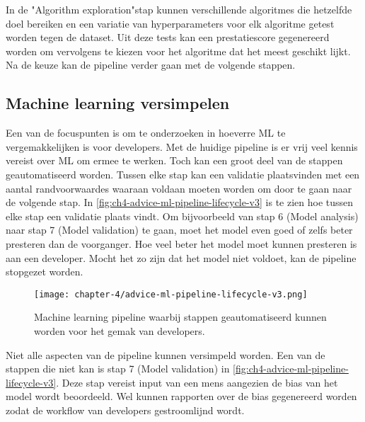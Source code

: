 In de "Algorithm exploration"\space stap kunnen verschillende algoritmes die hetzelfde doel bereiken en een variatie van hyperparameters voor elk algoritme getest worden tegen de dataset. Uit deze tests kan een prestatiescore gegenereerd worden om vervolgens te kiezen voor het algoritme dat het meest geschikt lijkt. Na de keuze kan de pipeline verder gaan met de volgende stappen.

\subsection{Machine learning versimpelen}\label{subsec:ch4-machine-learning-versimpelen}
Een van de focuspunten is om te onderzoeken in hoeverre ML te vergemakkelijken is voor developers. Met de huidige pipeline is er vrij veel kennis vereist over ML om ermee te werken. Toch kan een groot deel van de stappen geautomatiseerd worden. Tussen elke stap kan een validatie plaatsvinden met een aantal randvoorwaardes waaraan voldaan moeten worden om door te gaan naar de volgende stap. In \autoref{fig:ch4-advice-ml-pipeline-lifecycle-v3} is te zien hoe tussen elke stap een validatie plaats vindt. Om bijvoorbeeld van stap 6 (Model analysis) naar stap 7 (Model validation) te gaan, moet het model even goed of zelfs beter presteren dan de voorganger. Hoe veel beter het model moet kunnen presteren is aan een developer. Mocht het zo zijn dat het model niet voldoet, kan de pipeline stopgezet worden.

\newpage

\begin{figure}[hbt!]
  \centering
  \texttt{[image: chapter-4/advice-ml-pipeline-lifecycle-v3.png]}
  \caption{Machine learning pipeline waarbij stappen geautomatiseerd kunnen worden voor het gemak van developers.}
  \label{fig:ch4-advice-ml-pipeline-lifecycle-v3}
\end{figure}

Niet alle aspecten van de pipeline kunnen versimpeld worden. Een van de stappen die niet kan is stap 7 (Model validation) in \autoref{fig:ch4-advice-ml-pipeline-lifecycle-v3}. Deze stap vereist input van een mens aangezien de bias van het model wordt beoordeeld. Wel kunnen rapporten over de bias gegenereerd worden zodat de workflow van developers gestroomlijnd wordt.
